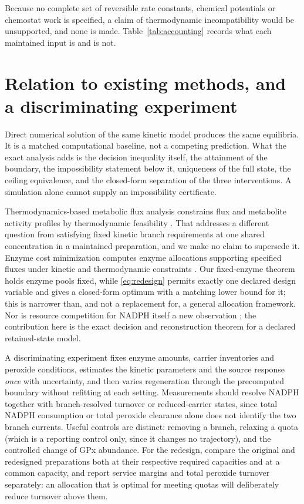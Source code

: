 \documentclass[11pt,a4paper]{article}
\theoremstyle{plain}
\theoremstyle{definition}
\theoremstyle{remark}
\begin{document}
Because no complete set of reversible rate constants, chemical potentials or
chemostat work is specified, a claim of thermodynamic incompatibility would be
unsupported, and none is made. Table~\ref{tab:accounting} records what each
maintained input is and is not.

\section{Relation to existing methods, and a discriminating experiment}
\label{sec:relation}

Direct numerical solution of the same kinetic model produces the same equilibria.
It is a matched computational baseline, not a competing prediction. What the exact
analysis adds is the decision inequality itself, the attainment of the boundary,
the impossibility statement below it, uniqueness of the full state, the ceiling
equivalence, and the closed-form separation of the three interventions. A
simulation alone cannot supply an impossibility certificate.

Thermodynamics-based metabolic flux analysis constrains flux and metabolite
activity profiles by thermodynamic feasibility \citep{henry2007}. That addresses a
different question from satisfying fixed kinetic branch requirements at one shared
concentration in a maintained preparation, and we make no claim to supersede it.
Enzyme cost minimization computes enzyme allocations supporting specified fluxes
under kinetic and thermodynamic constraints \citep{noor2016}. Our fixed-enzyme
theorem holds enzyme pools fixed, while \eqref{eq:redesign} permits exactly one
declared design variable and gives a closed-form optimum with a matching lower
bound for it; this is narrower than, and not a replacement for, a general
allocation framework. Nor is resource competition for NADPH itself a new
observation \citep{stanton2012,fan2014}; the contribution here is the exact
decision and reconstruction theorem for a declared retained-state model.

A discriminating experiment fixes enzyme amounts, carrier inventories and peroxide
conditions, estimates the kinetic parameters and the source response \emph{once}
with uncertainty, and then varies regeneration through the precomputed boundary
without refitting at each setting. Measurements should resolve NADPH together with
branch-resolved turnover or reduced-carrier states, since total NADPH consumption
or total peroxide clearance alone does not identify the two branch currents.
Useful controls are distinct: removing a branch, relaxing a quota (which is a
reporting control only, since it changes no trajectory), and the controlled change
of GPx abundance. For the redesign, compare the original and redesigned
preparations both at their respective required capacities and at a common
capacity, and report service margins and total peroxide turnover separately: an
allocation that is optimal for meeting quotas will deliberately reduce turnover
above them.
\end{document}
